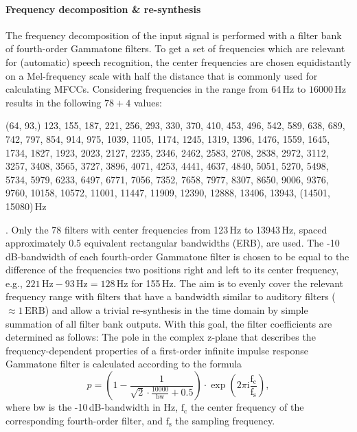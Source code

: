 \documentclass[10pt,a4paper,twocolumn]{article}
\begin{document}
\paragraph{Frequency decomposition \& re-synthesis}
%
The frequency decomposition of the input signal is performed with a filter bank of fourth-order Gammatone filters.
%
To get a set of frequencies which are relevant for (automatic) speech recognition, the center frequencies are chosen equidistantly on a Mel-frequency scale with half the distance that is commonly used for calculating MFCCs.
%
Considering frequencies in the range from $64\,\text{Hz}$ to $16000\,\text{Hz}$ results in the following $78+4$ values: \begin{footnotesize}(64, 93,) 123, 155, 187, 221, 256, 293, 330, 370, 410, 453, 496, 542, 589, 638, 689, 742, 797, 854, 914, 975, 1039, 1105, 1174, 1245, 1319, 1396, 1476, 1559, 1645, 1734, 1827, 1923, 2023, 2127, 2235, 2346, 2462, 2583, 2708, 2838, 2972, 3112, 3257, 3408, 3565, 3727, 3896, 4071, 4253, 4441, 4637, 4840, 5051, 5270, 5498, 5734, 5979, 6233, 6497, 6771, 7056, 7352, 7658, 7977, 8307, 8650, 9006, 9376, 9760, 10158, 10572, 11001, 11447, 11909, 12390, 12888, 13406, 13943, (14501, 15080)\,Hz\end{footnotesize}.
%
Only the 78 filters with center frequencies from 123\,Hz to 13943\,Hz, spaced approximately 0.5 equivalent rectangular bandwidths (ERB), are used.
%
The -10\,dB-bandwidth of each fourth-order Gammatone filter is chosen to be equal to the difference of the frequencies two positions right and left to its center frequency, e.g., $221\,\text{Hz}-93\,\text{Hz}=128\,\text{Hz}$ for 155\,Hz.
%
The aim is to evenly cover the relevant frequency range with filters that have a bandwidth similar to auditory filters ($\approx1\,\text{ERB}$) and allow a trivial re-synthesis in the time domain by simple summation of all filter bank outputs.
%
With this goal, the filter coefficients are determined as follows:
%	
The pole in the complex z-plane that describes the frequency-dependent properties of a first-order infinite impulse response Gammatone filter is calculated according to the formula
\begin{equation}
p = \left(1-\frac{1}{\sqrt{2} \cdot \frac{10000}{\text{bw}} + 0.5}\right) \cdot \exp\left(2\pi \text{i} \frac{\text{f}_\text{c}}{\text{f}_\text{s}}\right),
\end{equation}
%
where bw is the -10\,dB-bandwidth in Hz, $\text{f}_\text{c}$ the center frequency of the corresponding fourth-order filter, and $\text{f}_\text{s}$ the sampling frequency.
\end{document}

